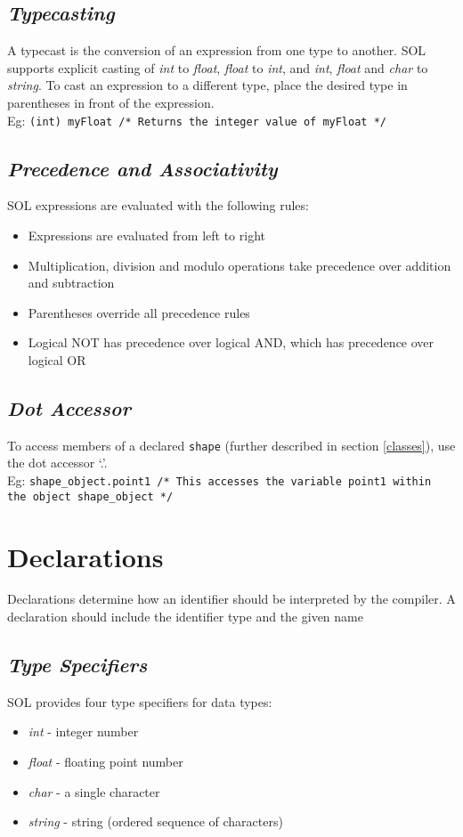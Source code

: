 \documentclass[letterpaper,12pt]{article}
\begin{document}
	\subsection{\textit{Typecasting}}
	A typecast is the conversion of an expression from one type to another. SOL supports explicit casting of \textit{int} to \textit{float}, \textit{float} to \textit{int}, and \textit{int}, \textit{float} and \textit{char} to \textit{string}. To cast an expression to a different type, place the desired type in parentheses in front of the expression. \\
	Eg: \texttt{(int) myFloat /* Returns the integer value of myFloat */}
	
	\subsection{\textit{Precedence and Associativity}}
	SOL expressions are evaluated with the following rules:
	\begin{itemize}
		\itemsep0em
		\item Expressions are evaluated from left to right
		\item Multiplication, division and modulo operations take precedence over addition and subtraction
		\item Parentheses override all precedence rules
		\item Logical NOT has precedence over logical AND, which has precedence over logical OR
	\end{itemize}
	
	\subsection{\textit{Dot Accessor}}
	To access members of a declared \texttt{shape} (further described in section \ref{classes}), use the dot accessor `.'. \\
	Eg: \texttt{shape\_object.point1 /* This accesses the variable point1 within the object shape\_object */}


\section{Declarations}

    Declarations determine how an identifier should be interpreted by the compiler. A declaration should include the identifier type and the given name

    \subsection{\textit{Type Specifiers}} \label{type}
    SOL provides four type specifiers for data types:
    \begin{itemize}
        \itemsep0em
        \item \textit{int} - integer number
        \item \textit{float} - floating point number
        \item \textit{char} - a single character
        \item \textit{string} - string (ordered sequence of characters)
    \end{itemize}
\end{document}
